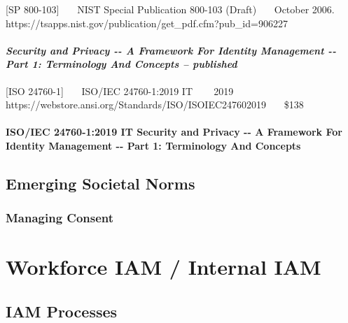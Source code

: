 {[}SP 800-103{]}~~~ NIST Special Publication 800-103 (Draft)~~~ October
2006.~~~
https://tsapps.nist.gov/publication/get\_pdf.cfm?pub\_id=906227~~~

\hypertarget{security-and-privacy----a-framework-for-identity-management----part-1-terminology-and-concepts-published}{%
\subsubsection{\texorpdfstring{\emph{Security and Privacy -\/- A Framework
For Identity Management -\/- Part 1: Terminology And Concepts --
published}}{Security and Privacy -\/- A Framework For Identity Management -\/- Part 1: Terminology And Concepts -- published}}\label{security-and-privacy----a-framework-for-identity-management----part-1-terminology-and-concepts-published}}

{[}ISO 24760-1{]}~~~ ISO/IEC 24760-1:2019 IT ~~~ 2019~~~
https://webstore.ansi.org/Standards/ISO/ISOIEC247602019~~~ \$138

\hypertarget{isoiec-24760-12019-it-security-and-privacy----a-framework-for-identity-management----part-1-terminology-and-concepts}{%
\subsubsection{ISO/IEC 24760-1:2019 IT Security and Privacy -\/- A Framework
For Identity Management -\/- Part 1: Terminology And
Concepts}\label{isoiec-24760-12019-it-security-and-privacy----a-framework-for-identity-management----part-1-terminology-and-concepts}}

\hypertarget{emerging-societal-norms}{%
\section{Emerging Societal Norms}\label{emerging-societal-norms}}

\hypertarget{managing-consent}{%
\subsection{Managing Consent }\label{managing-consent}}

\hypertarget{workforce-iam-internal-iam}{%
\chapter{Workforce IAM / Internal
IAM}\label{workforce-iam-internal-iam}}

\hypertarget{iam-processes}{%
\section{IAM Processes}\label{iam-processes}}

